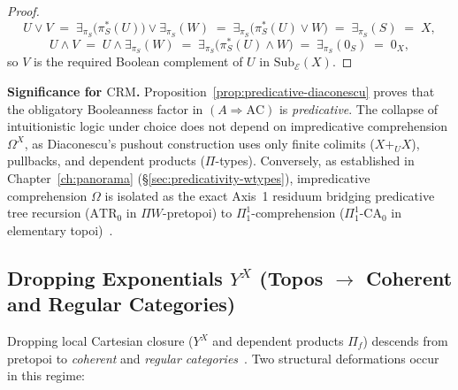 \begin{proof}
\[
  U \vee V \;=\; \exists_{\pi_S}\bigl(\pi_S^*(U)\bigr) \vee \exists_{\pi_S}(W) \;=\; \exists_{\pi_S}\bigl(\pi_S^*(U) \vee W\bigr) \;=\; \exists_{\pi_S}(S) \;=\; X,
\]
\[
  U \wedge V \;=\; U \wedge \exists_{\pi_S}(W) \;=\; \exists_{\pi_S}\bigl(\pi_S^*(U) \wedge W\bigr) \;=\; \exists_{\pi_S}(0_S) \;=\; 0_X,
\]
so $V$ is the required Boolean complement of $U$ in $\mathrm{Sub}_{\mathcal{E}}(X)$.
\end{proof}

\textbf{Significance for $\mathrm{CRM}$.} Proposition~\ref{prop:predicative-diaconescu} proves that the obligatory Booleanness factor in $(A \Rightarrow \mathrm{AC})$ is \emph{predicative}. The collapse of intuitionistic logic under choice does not depend on impredicative comprehension $\Omega^X$, as Diaconescu's pushout construction uses only finite colimits ($X +_U X$), pullbacks, and dependent products ($\Pi$-types). Conversely, as established in Chapter~\ref{ch:panorama} (\S\ref{sec:predicativity-wtypes}), impredicative comprehension $\Omega$ is isolated as the exact Axis~1 residuum bridging predicative tree recursion ($\mathrm{ATR}_0$ in $\Pi W$-pretopoi) to $\Pi^1_1$-comprehension ($\Pi^1_1\text{-}\mathrm{CA}_0$ in elementary topoi)~\cite{Maietti05}.

\subsection{Dropping Exponentials $Y^X$ (Topos $\to$ Coherent and Regular Categories)}

Dropping local Cartesian closure ($Y^X$ and dependent products $\Pi_f$) descends from pretopoi to \emph{coherent} and \emph{regular categories}~\cite{Johnstone02}. Two structural deformations occur in this regime:

